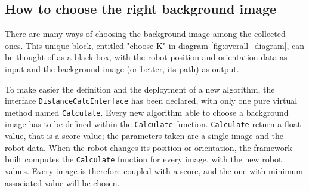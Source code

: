 


\subsection{How to choose the right background image}
\label{sub:howbackgroundimage}

There are many ways of choosing the background image among the collected ones. This unique
block, entitled "choose K" in diagram \ref{fig:overall_diagram}, can be thought of as a
black box, with the robot position and orientation data as input and the background image
(or better, its path) as output.
%

%
To make easier the definition and the deployment of a new algorithm, the interface
\texttt{DistanceCalcInterface} has been declared, with only one pure virtual method named
\texttt{Calculate}. Every new algorithm able to choose a background image has to be defined
within the \texttt{Calculate} function.
\texttt{Calculate} return a float value, that is a score value; the parameters taken are a
single image and the robot data. When the robot changes its position or orientation, the
framework built computes the \texttt{Calculate} function for every image, with the new robot
values. Every image is therefore coupled with a score, and the one with minimum associated value
will be chosen.
%

